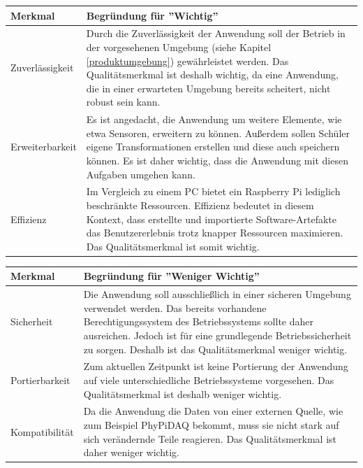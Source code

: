 \documentclass[parskip=full]{scrartcl}
\begin{document}
\begin{tabular}{| p{3cm} | p{10cm} |}
	\hline
	\textbf{Merkmal} & \textbf{Begründung für ''Wichtig''}\\
	\hline
	
	Zuverlässigkeit & Durch die Zuverlässigkeit der Anwendung soll der Betrieb in der vorgesehenen Umgebung (siehe Kapitel \ref{produktumgebung}) gewährleistet werden. Das Qualitätsmerkmal ist deshalb wichtig, da eine Anwendung, die in einer erwarteten Umgebung bereits scheitert, nicht robust sein kann.\\\cline{1-2}
	
	Erweiterbarkeit & Es ist angedacht, die Anwendung um weitere Elemente, wie etwa Sensoren, erweitern zu können. Außerdem sollen Schüler eigene Transformationen erstellen und diese auch speichern können. Es ist daher wichtig, dass die Anwendung mit diesen Aufgaben umgehen kann.\\\cline{1-2}
	
	Effizienz & Im Vergleich zu einem PC bietet ein Raspberry Pi lediglich beschränkte Ressourcen. Effizienz bedeutet in diesem Kontext, dass erstellte und importierte Software-Artefakte das Benutzererlebnis trotz knapper Ressourcen maximieren. Das Qualitätsmerkmal ist somit wichtig.\\\cline{1-2}

	\hline
\end{tabular}

\begin{tabular}{| p{3cm} | p{10cm} |}
	\hline
	\textbf{Merkmal} & \textbf{Begründung für ''Weniger Wichtig''}\\
	\hline
		
	Sicherheit & Die Anwendung soll ausschließlich in einer sicheren Umgebung verwendet werden. Das bereits vorhandene Berechtigungssystem des Betriebssystems sollte daher ausreichen. Jedoch ist für eine grundlegende Betriebssicherheit zu sorgen. Deshalb ist das Qualitätsmerkmal weniger wichtig.\\\cline{1-2}
	
	Portierbarkeit & Zum aktuellen Zeitpunkt ist keine Portierung der Anwendung auf viele unterschiedliche Betriebssysteme vorgesehen. Das Qualitätsmerkmal ist deshalb weniger wichtig.\\\cline{1-2}
	
	Kompatibilität & Da die Anwendung die Daten von einer externen Quelle, wie zum Beispiel \gls{PhyPiDAQ} bekommt, muss sie nicht stark auf sich verändernde Teile reagieren. Das Qualitätsmerkmal ist daher weniger wichtig.\\\cline{1-2}
	\hline
\end{tabular}
\end{document}

